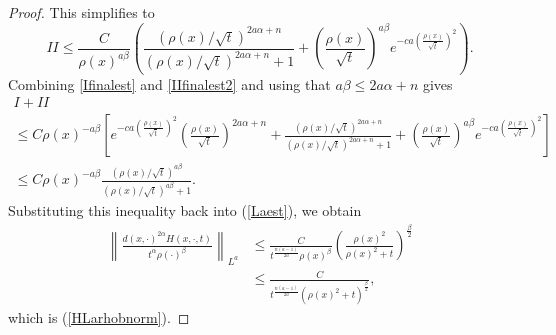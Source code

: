 \documentclass[12pt]{amsart}
\renewcommand{\1}{{\mathbf 1}}
\theoremstyle{others}
\numberwithin{equation}{section}
\begin{document}
\begin{proof}
    This simplifies to 
    \begin{equation} \label{IIfinalest2}
        II \le
        \frac C{\rho(x)^{a \beta} } \left( \frac{(\rho(x)/\sqrt t)^{2 a \alpha + n}}{(\rho(x)/\sqrt t)^{2 a \alpha+n} + 1}
        +  \left( \frac {\rho(x)} {\sqrt t}\right)^{a \beta}  e^{- c a \left(\frac{\rho(x)}{\sqrt t} \right)^2} \right) .
    \end{equation}
    Combining \eqref{Ifinalest} and \eqref{IIfinalest2} and using that $a \beta \le 2 a \alpha + n$ gives
    \begin{multline}
        I + II \\
        \le C \rho(x)^{- a\beta} \left[  e^{-c a \left( \frac {\rho(x)}{\sqrt t} \right)^2 } \left( \frac{\rho(x)}{\sqrt t} \right)^{2 a \alpha + n} +\frac{(\rho(x)/\sqrt t)^{2 a \alpha + n}}{(\rho(x)/\sqrt t)^{2 a \alpha+n} + 1}
        +  \left( \frac {\rho(x)} {\sqrt t}\right)^{a \beta}  e^{- c a \left(\frac{\rho(x)}{\sqrt t} \right)^2}  \right] \\
        \le C \rho(x)^{- a\beta} \frac{ ( \rho(x)/ \sqrt t )^{a \beta} }{(\rho(x)/\sqrt t)^{a \beta} +1}.
    \end{multline}
    Substituting this inequality back into (\ref{Laest}), we obtain
    \begin{equation*}
    \begin{split}
        \left\|  \frac{d(x,\cdot)^{2\alpha} H(x,\cdot, t) }{t^\alpha \rho(\cdot)^\beta} \right\|_{L^{a}} & \leq \frac{C}{t^{\frac{n(a - 1)}{2a}} \rho(x)^\beta} \left( \frac{ \rho(x)^{2} }{ \rho(x)^{2} + t} \right)^{\frac{\beta}{2}} \\
        & \leq \frac{C}{t^{\frac{n(a - 1)}{2a}} \left( \rho(x)^{2} + t \right)^{\frac{\beta}{2}} },
        \end{split}
    \end{equation*}
    which is (\ref{HLarhobnorm}).
\end{proof}
\end{document}
